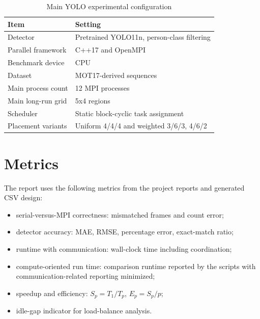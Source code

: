 \begin{table}[H]
\centering
\caption{Main YOLO experimental configuration}
\label{tab:main-config}
\begin{tabularx}{\textwidth}{L{4.0cm} X}
\toprule
Item & Setting \\
\midrule
Detector & Pretrained YOLO11n, person-class filtering \\
Parallel framework & C++17 and OpenMPI \\
Benchmark device & CPU \\
Dataset & MOT17-derived sequences \\
Main process count & 12 MPI processes \\
Main long-run grid & 5x4 regions \\
Scheduler & Static block-cyclic task assignment \\
Placement variants & Uniform 4/4/4 and weighted 3/6/3, 4/6/2 \\
\bottomrule
\end{tabularx}
\end{table}

\section{Metrics}
The report uses the following metrics from the project reports and generated CSV design:
\begin{itemize}
    \item serial-versus-MPI correctness: mismatched frames and count error;
    \item detector accuracy: MAE, RMSE, percentage error, exact-match ratio;
    \item runtime with communication: wall-clock time including coordination;
    \item compute-oriented run time: comparison runtime reported by the scripts with communication-related reporting minimized;
    \item speedup and efficiency: \(S_p = T_1/T_p\), \(E_p = S_p/p\);
    \item idle-gap indicator for load-balance analysis.
\end{itemize}
